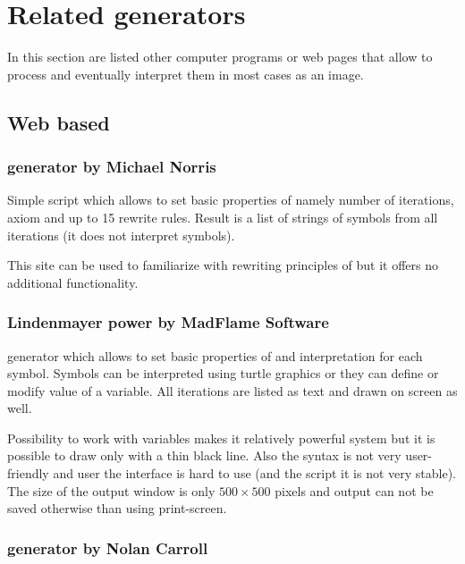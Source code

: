 
\section{Related \lsystem generators}

In this section are listed other computer programs or web pages that allow to process \lsystems and eventually interpret them in most cases as an image.

\subsection{Web based}
\label{sec:WebBasedGenerators}

\subsubsection{\lsystem generator by Michael Norris}

\noindent
Simple script which allows to set basic properties of \lsystem namely number of iterations, axiom and up to 15 rewrite rules.
Result is a list of strings of symbols from all iterations (it does not interpret symbols).

This site can be used to familiarize with rewriting principles of \lsystems but it offers no additional functionality.


\subsubsection{Lindenmayer power by MadFlame Software}

\noindent
\lsystem generator which allows to set basic properties of \lsystem and interpretation for each symbol.
Symbols can be interpreted using turtle graphics or they can define or modify value of a variable.
All iterations are listed as text and drawn on screen as well.

Possibility to work with variables makes it relatively powerful system but it is possible to draw only with a thin black line.
Also the syntax is not very user-friendly and user the interface is hard to use (and the script it is not very stable).
The size of the output window is only $500 \times 500$ pixels and output can not be saved otherwise than using print-screen.


\subsubsection{\lsystem generator by Nolan Carroll}	

